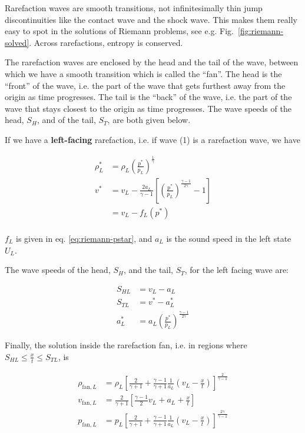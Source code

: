 Rarefaction waves are smooth transitions, not infinitesimally thin jump
discontinuities like the contact wave and the shock wave. This makes them
really easy to spot in the solutions of Riemann problems, see e.g.
Fig.~\ref{fig:riemann-solved}. Across rarefactions, entropy is conserved.

The rarefaction waves are enclosed by the head and the tail of the wave,
between which we have a smooth transition which is called the ``fan''. The head
is the ``front'' of the wave, i.e. the part of the wave that gets furthest away
from the origin as time progresses. The tail is the ``back'' of the wave, i.e.
the part of the wave that stays closest to the origin as time progresses.
The wave speeds of the head, $S_H$, and of the tail, $S_T$, are both given
below.


If we have a \textbf{left-facing} rarefaction, i.e. if wave (1) is a rarefaction wave, we have

\begin{align*}
\rho^*_L &=
	\rho_L \left( \frac{p^*}{p_L} \right) ^ \frac{1}{\gamma}\\
v^* &=
	v_L - \frac{2 a_L}{\gamma - 1} \left[
		\left( \frac{p^*}{p_L} \right) ^ \frac{\gamma - 1}{2 \gamma} -1
	\right]\\
	& = v_L - f_L(p^*) \\
\end{align*}

$f_{L}$ is given in eq. \ref{eq:riemann-pstar}, and $a_L$ is the sound speed in
the left state $U_L$.


The wave speeds of the head, $S_H$, and the tail, $S_T$, for the left facing
wave are:

\begin{align*}
	S_{HL} &= v_L - a_L\\
	S_{TL} &= v^* - a^*_L\\
	a^*_L  &= a_L \left( \frac{p^*}{p_L} \right) ^ \frac{\gamma - 1}{2 \gamma}
\end{align*}


Finally, the solution inside the rarefaction fan, i.e. in regions where $S_{HL}
\leq \frac{x}{t} \leq S_{TL}$, is

\begin{align}
\rho_{\text{fan}, L} &=
	\rho_L \left[
		\frac{2}{\gamma + 1} +
		\frac{\gamma - 1}{\gamma + 1}
		\frac{1}{a_L}
		\left(v_L - \frac{x}{t}\right)
	\right] ^ \frac{2}{\gamma -1 }
	\label{eq:rho-rarefaction-fan-left}\\
v_{\text{fan}, L} &=
	\frac{2}{\gamma + 1} \left[
		\frac{\gamma - 1}{2} v_L + a_L + \frac{x}{t}
	\right] \\
p_{\text{fan}, L} &=
	p_L \left[
		\frac{2}{\gamma + 1} +
		\frac{\gamma - 1}{\gamma + 1}
		\frac{1}{a_L}
		\left(v_L - \frac{x}{t}\right)
	\right] ^ \frac{2 \gamma}{\gamma -1}
	\label{eq:pressure-rarefaction-fan-left}
\end{align}









